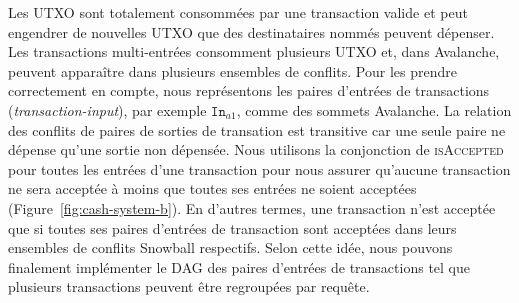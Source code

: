 \documentclass[letterpaper,twocolumn,10pt]{article}
\theoremstyle{definition}
\begin{document}
Les UTXO sont totalement consommées par une transaction valide et peut engendrer de nouvelles UTXO que des destinataires nommés peuvent dépenser.
Les transactions multi-entrées consomment plusieurs UTXO et, dans Avalanche, peuvent apparaître dans plusieurs ensembles de conflits.
Pour les prendre correctement en compte, nous représentons les paires d'entrées de transactions (\emph{transaction-input}), par exemple $\texttt{In}_{a1}$, comme des sommets Avalanche.
La relation des conflits de paires de sorties de transation est transitive car une seule paire ne dépense qu'une sortie non dépensée.
Nous utilisons la conjonction de \textsc{isAccepted} pour toutes les entrées d'une transaction pour nous assurer qu'aucune transaction ne sera acceptée à moins que toutes ses entrées ne soient acceptées (Figure~\ref{fig:cash-system-b}). En d'autres termes, une transaction n'est acceptée que si toutes ses paires d'entrées de transaction sont acceptées dans leurs ensembles de conflits Snowball respectifs.
Selon cette idée, nous pouvons finalement implémenter le DAG des paires d'entrées de transactions tel que plusieurs transactions peuvent être regroupées par requête.


\end{document}
